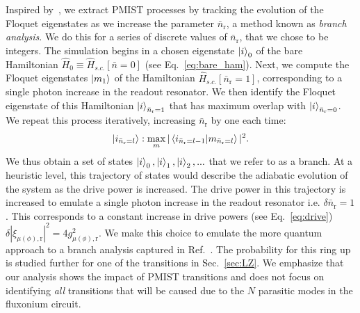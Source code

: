 \documentclass[%
reprint,
superscriptaddress,
 amsmath,amssymb,
 aps,
 prx,
longbibliography,
floatfix,
]{revtex4-2}
\begin{document}
Inspired by~\cite{dumas2024unified,cohen2023reminiscence}, we extract PMIST processes by tracking the evolution of  the Floquet eigenstates as we increase the parameter $\bar{n}_\textrm{r}$, a method known as \emph{branch analysis}. 
We do this for a series of discrete values of $\bar{n}_\textrm{r}$, that we chose to be integers.  The simulation begins in a chosen eigenstate $\ket{i}_0$ of the bare Hamiltonian $\hat{H}_0 \equiv \hat{H}_{s.c.}[\bar{n}=0]$ (see Eq.~\ref{eq:bare_ham}). 
Next, we compute the Floquet eigenstates $\ket{m_1}$ of the Hamiltonian $\hat{H}_{s.c.}[\bar{n}_\textrm{r}=1]$,
corresponding to a single photon increase in the readout resonator. We then identify the Floquet eigenstate of this Hamiltonian $\ket{i}_{\bar n_\textrm{r}=1}$ that has maximum overlap with $\ket{i}_{\bar n_\textrm{r}=0}$.  We repeat this process iteratively, increasing $\bar{n}_\textrm{r}$ by one each time:
\begin{align}
\ket{i_{\bar n_\textrm{r}=l}}:\max_{m}|\braket{i_{\bar n_\textrm{r}=l-1}|{m}_{\bar n_\textrm{r}=l}}|^2.\label{eq:track_Floquet}   
\end{align}
We thus obtain a set of states $\ket{i}_0,\ket{i}_1,\ket{i}_2,...$ that we refer to as a branch.  At a heuristic level, this trajectory of states would describe the adiabatic evolution of the system as the drive power is increased. The drive power in this trajectory is increased to emulate a single photon increase in the readout resonator i.e. $\delta \bar n_\textrm{r}=1$. This corresponds to a constant increase in drive powers (see Eq.~\ref{eq:drive}) $\delta |\xi_{\mu (\phi),\textrm{r}}|^2=4g_{\mu (\phi),\textrm{r}}^2$. We make this choice to emulate the more quantum approach to a branch analysis captured in Ref.~\cite{shillito2022dynamics,dumas2024unified}. The probability for this ring up is studied further for one of the transitions in Sec.~\ref{sec:LZ}. We emphasize that our analysis shows the impact of PMIST transitions and does not focus on identifying \emph{all} transitions that will be caused due to the $N$ parasitic modes in the fluxonium circuit.
\end{document}
